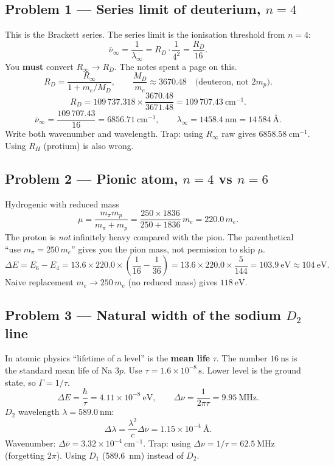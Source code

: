 \documentclass[11pt,a4paper]{article}
\begin{document}
\subsection{Problem 1 --- Series limit of deuterium, \(n=4\)}
This is the Brackett series. The series limit is the ionisation threshold from \(n=4\):
\[
\bar\nu_\infty = \frac{1}{\lambda_\infty}=R_D\cdot\frac{1}{4^2}=\frac{R_D}{16}.
\]
You \textbf{must} convert \(R_\infty\to R_D\). The notes spent a page on this.
\[
R_D=\frac{R_\infty}{1+m_e/M_D},\qquad \frac{M_D}{m_e}\approx 3670.48
\quad\text{(deuteron, not \(2m_p\))}.
\]
\[
R_D=109\,737.318\times\frac{3670.48}{3671.48}=109\,707.43~\mathrm{cm}^{-1}.
\]
\[
\bar\nu_\infty=\frac{109\,707.43}{16}=6856.71~\mathrm{cm}^{-1},
\qquad
\lambda_\infty=1458.4~\mathrm{nm}=14\,584~\text{\AA}.
\]
Write both wavenumber and wavelength. Trap: using \(R_\infty\) raw gives \(6858.58~\mathrm{cm}^{-1}\). Using \(R_H\) (protium) is also wrong.

\subsection{Problem 2 --- Pionic atom, \(n=4\) vs \(n=6\)}
Hydrogenic with reduced mass
\[
\mu=\frac{m_\pi m_p}{m_\pi+m_p}
=\frac{250\times 1836}{250+1836}\,m_e
=220.0\,m_e.
\]
The proton is \emph{not} infinitely heavy compared with the pion. The parenthetical ``use \(m_\pi=250\,m_e\)'' gives you the pion mass, not permission to skip \(\mu\).
\[
\Delta E=E_6-E_4
=13.6\times 220.0\times\left(\frac{1}{16}-\frac{1}{36}\right)
=13.6\times 220.0\times\frac{5}{144}
=103.9~\mathrm{eV}\approx 104~\mathrm{eV}.
\]
Naive replacement \(m_e\to 250\,m_e\) (no reduced mass) gives \(118~\mathrm{eV}\).

\subsection{Problem 3 --- Natural width of the sodium \(D_2\) line}
In atomic physics ``lifetime of a level'' is the \textbf{mean life} \(\tau\). The number \(16~\mathrm{ns}\) is the standard mean life of Na \(3p\). Use \(\tau=1.6\times 10^{-8}\,\mathrm{s}\). Lower level is the ground state, so \(\Gamma=1/\tau\).
\[
\Delta E=\frac{\hbar}{\tau}=4.11\times 10^{-8}~\mathrm{eV},\qquad
\Delta\nu=\frac{1}{2\pi\tau}=9.95~\mathrm{MHz}.
\]
\(D_2\) wavelength \(\lambda=589.0~\mathrm{nm}\):
\[
\Delta\lambda=\frac{\lambda^2}{c}\Delta\nu=1.15\times 10^{-4}~\text{\AA}.
\]
Wavenumber: \(\Delta\bar\nu=3.32\times 10^{-4}~\mathrm{cm}^{-1}\).
Trap: using \(\Delta\nu=1/\tau=62.5~\mathrm{MHz}\) (forgetting \(2\pi\)). Using \(D_1\) (589.6~nm) instead of \(D_2\).
\end{document}
